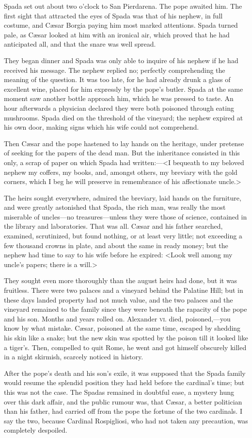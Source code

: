 {Spada set out about two o'clock to San Pierdarena. The pope awaited him. The first sight that attracted the eyes of Spada was that of his nephew, in full costume, and Cæsar Borgia paying him most marked attentions. Spada turned pale, as Cæsar looked at him with an ironical air, which proved that he had anticipated all, and that the snare was well spread. 

They began dinner and Spada was only able to inquire of his nephew if he had received his message. The nephew replied no; perfectly comprehending the meaning of the question. It was too late, for he had already drunk a glass of excellent wine, placed for him expressly by the pope's butler. Spada at the same moment saw another bottle approach him, which he was pressed to taste. An hour afterwards a physician declared they were both poisoned through eating mushrooms. Spada died on the threshold of the vineyard; the nephew expired at his own door, making signs which his wife could not comprehend. 

Then Cæsar and the pope hastened to lay hands on the heritage, under pretense of seeking for the papers of the dead man. But the inheritance consisted in this only, a scrap of paper on which Spada had written:—<I bequeath to my beloved nephew my coffers, my books, and, amongst others, my breviary with the gold corners, which I beg he will preserve in remembrance of his affectionate uncle.> 

The heirs sought everywhere, admired the breviary, laid hands on the furniture, and were greatly astonished that Spada, the rich man, was really the most miserable of uncles—no treasures—unless they were those of science, contained in the library and laboratories. That was all. Cæsar and his father searched, examined, scrutinized, but found nothing, or at least very little; not exceeding a few thousand crowns in plate, and about the same in ready money; but the nephew had time to say to his wife before he expired: <Look well among my uncle's papers; there is a will.> 

They sought even more thoroughly than the august heirs had done, but it was fruitless. There were two palaces and a vineyard behind the Palatine Hill; but in these days landed property had not much value, and the two palaces and the vineyard remained to the family since they were beneath the rapacity of the pope and his son. Months and years rolled on. Alexander \textsc{vi.} died, poisoned,—you know by what mistake. Cæsar, poisoned at the same time, escaped by shedding his skin like a snake; but the new skin was spotted by the poison till it looked like a tiger's. Then, compelled to quit Rome, he went and got himself obscurely killed in a night skirmish, scarcely noticed in history. 

After the pope's death and his son's exile, it was supposed that the Spada family would resume the splendid position they had held before the cardinal's time; but this was not the case. The Spadas remained in doubtful ease, a mystery hung over this dark affair, and the public rumour was, that Cæsar, a better politician than his father, had carried off from the pope the fortune of the two cardinals. I say the two, because Cardinal Rospigliosi, who had not taken any precaution, was completely despoiled.}

